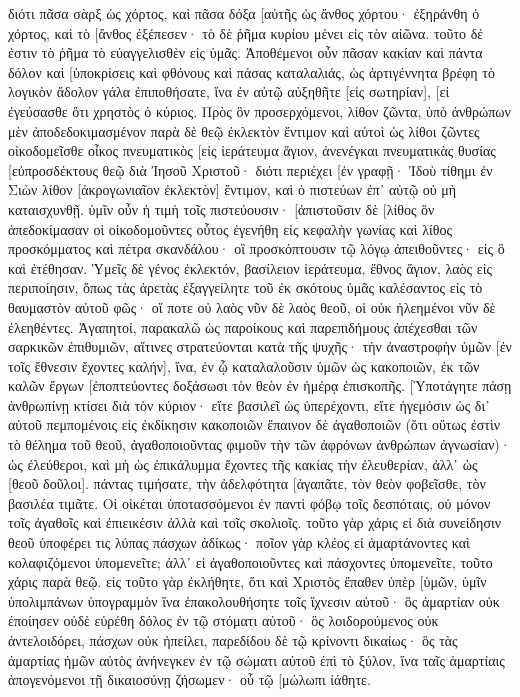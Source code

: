 διότι πᾶσα σὰρξ ὡς χόρτος, καὶ πᾶσα δόξα [αὐτῆς ὡς ἄνθος χόρτου· ἐξηράνθη ὁ χόρτος, καὶ τὸ [ἄνθος ἐξέπεσεν· 
τὸ δὲ ῥῆμα κυρίου μένει εἰς τὸν αἰῶνα. τοῦτο δέ ἐστιν τὸ ῥῆμα τὸ εὐαγγελισθὲν εἰς ὑμᾶς. 
Ἀποθέμενοι οὖν πᾶσαν κακίαν καὶ πάντα δόλον καὶ [ὑποκρίσεις καὶ φθόνους καὶ πάσας καταλαλιάς, 
ὡς ἀρτιγέννητα βρέφη τὸ λογικὸν ἄδολον γάλα ἐπιποθήσατε, ἵνα ἐν αὐτῷ αὐξηθῆτε [εἰς σωτηρίαν], 
[εἰ ἐγεύσασθε ὅτι χρηστὸς ὁ κύριος. 
Πρὸς ὃν προσερχόμενοι, λίθον ζῶντα, ὑπὸ ἀνθρώπων μὲν ἀποδεδοκιμασμένον παρὰ δὲ θεῷ ἐκλεκτὸν ἔντιμον 
καὶ αὐτοὶ ὡς λίθοι ζῶντες οἰκοδομεῖσθε οἶκος πνευματικὸς [εἰς ἱεράτευμα ἅγιον, ἀνενέγκαι πνευματικὰς θυσίας [εὐπροσδέκτους θεῷ διὰ Ἰησοῦ Χριστοῦ· 
διότι περιέχει [ἐν γραφῇ· Ἰδοὺ τίθημι ἐν Σιὼν λίθον [ἀκρογωνιαῖον ἐκλεκτὸν] ἔντιμον, καὶ ὁ πιστεύων ἐπ᾽ αὐτῷ οὐ μὴ καταισχυνθῇ. 
ὑμῖν οὖν ἡ τιμὴ τοῖς πιστεύουσιν· [ἀπιστοῦσιν δὲ [λίθος ὃν ἀπεδοκίμασαν οἱ οἰκοδομοῦντες οὗτος ἐγενήθη εἰς κεφαλὴν γωνίας 
καὶ λίθος προσκόμματος καὶ πέτρα σκανδάλου· οἳ προσκόπτουσιν τῷ λόγῳ ἀπειθοῦντες· εἰς ὃ καὶ ἐτέθησαν. 
Ὑμεῖς δὲ γένος ἐκλεκτόν, βασίλειον ἱεράτευμα, ἔθνος ἅγιον, λαὸς εἰς περιποίησιν, ὅπως τὰς ἀρετὰς ἐξαγγείλητε τοῦ ἐκ σκότους ὑμᾶς καλέσαντος εἰς τὸ θαυμαστὸν αὐτοῦ φῶς· 
οἵ ποτε οὐ λαὸς νῦν δὲ λαὸς θεοῦ, οἱ οὐκ ἠλεημένοι νῦν δὲ ἐλεηθέντες. 
Ἀγαπητοί, παρακαλῶ ὡς παροίκους καὶ παρεπιδήμους ἀπέχεσθαι τῶν σαρκικῶν ἐπιθυμιῶν, αἵτινες στρατεύονται κατὰ τῆς ψυχῆς· 
τὴν ἀναστροφὴν ὑμῶν [ἐν τοῖς ἔθνεσιν ἔχοντες καλήν], ἵνα, ἐν ᾧ καταλαλοῦσιν ὑμῶν ὡς κακοποιῶν, ἐκ τῶν καλῶν ἔργων [ἐποπτεύοντες δοξάσωσι τὸν θεὸν ἐν ἡμέρᾳ ἐπισκοπῆς. 
[Ὑποτάγητε πάσῃ ἀνθρωπίνῃ κτίσει διὰ τὸν κύριον· εἴτε βασιλεῖ ὡς ὑπερέχοντι, 
εἴτε ἡγεμόσιν ὡς δι᾽ αὐτοῦ πεμπομένοις εἰς ἐκδίκησιν κακοποιῶν ἔπαινον δὲ ἀγαθοποιῶν 
(ὅτι οὕτως ἐστὶν τὸ θέλημα τοῦ θεοῦ, ἀγαθοποιοῦντας φιμοῦν τὴν τῶν ἀφρόνων ἀνθρώπων ἀγνωσίαν)· 
ὡς ἐλεύθεροι, καὶ μὴ ὡς ἐπικάλυμμα ἔχοντες τῆς κακίας τὴν ἐλευθερίαν, ἀλλ᾽ ὡς [θεοῦ δοῦλοι]. 
πάντας τιμήσατε, τὴν ἀδελφότητα [ἀγαπᾶτε, τὸν θεὸν φοβεῖσθε, τὸν βασιλέα τιμᾶτε. 
Οἱ οἰκέται ὑποτασσόμενοι ἐν παντὶ φόβῳ τοῖς δεσπόταις, οὐ μόνον τοῖς ἀγαθοῖς καὶ ἐπιεικέσιν ἀλλὰ καὶ τοῖς σκολιοῖς. 
τοῦτο γὰρ χάρις εἰ διὰ συνείδησιν θεοῦ ὑποφέρει τις λύπας πάσχων ἀδίκως· 
ποῖον γὰρ κλέος εἰ ἁμαρτάνοντες καὶ κολαφιζόμενοι ὑπομενεῖτε; ἀλλ᾽ εἰ ἀγαθοποιοῦντες καὶ πάσχοντες ὑπομενεῖτε, τοῦτο χάρις παρὰ θεῷ. 
εἰς τοῦτο γὰρ ἐκλήθητε, ὅτι καὶ Χριστὸς ἔπαθεν ὑπὲρ [ὑμῶν, ὑμῖν ὑπολιμπάνων ὑπογραμμὸν ἵνα ἐπακολουθήσητε τοῖς ἴχνεσιν αὐτοῦ· 
ὃς ἁμαρτίαν οὐκ ἐποίησεν οὐδὲ εὑρέθη δόλος ἐν τῷ στόματι αὐτοῦ· 
ὃς λοιδορούμενος οὐκ ἀντελοιδόρει, πάσχων οὐκ ἠπείλει, παρεδίδου δὲ τῷ κρίνοντι δικαίως· 
ὃς τὰς ἁμαρτίας ἡμῶν αὐτὸς ἀνήνεγκεν ἐν τῷ σώματι αὐτοῦ ἐπὶ τὸ ξύλον, ἵνα ταῖς ἁμαρτίαις ἀπογενόμενοι τῇ δικαιοσύνῃ ζήσωμεν· οὗ τῷ [μώλωπι ἰάθητε. 
